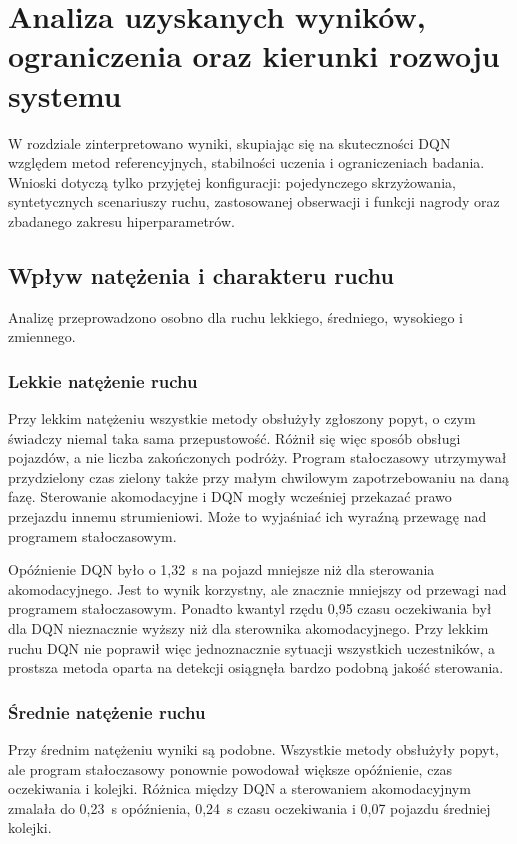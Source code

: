 \clearpage
\section{Analiza uzyskanych wyników, ograniczenia oraz kierunki rozwoju systemu}
\label{sec:analiza}

W rozdziale zinterpretowano wyniki, skupiając się na skuteczności DQN względem metod referencyjnych, stabilności uczenia i ograniczeniach badania. Wnioski dotyczą tylko przyjętej konfiguracji: pojedynczego skrzyżowania, syntetycznych scenariuszy ruchu, zastosowanej obserwacji i funkcji nagrody oraz zbadanego zakresu hiperparametrów.

\subsection{Wpływ natężenia i charakteru ruchu}
\label{subsec:analiza-natezenia}

Analizę przeprowadzono osobno dla ruchu lekkiego, średniego, wysokiego i zmiennego.

\subsubsection{Lekkie natężenie ruchu}

Przy lekkim natężeniu wszystkie metody obsłużyły zgłoszony popyt, o czym świadczy niemal taka sama przepustowość. Różnił się więc sposób obsługi pojazdów, a nie liczba zakończonych podróży. Program stałoczasowy utrzymywał przydzielony czas zielony także przy małym chwilowym zapotrzebowaniu na daną fazę. Sterowanie akomodacyjne i DQN mogły wcześniej przekazać prawo przejazdu innemu strumieniowi. Może to wyjaśniać ich wyraźną przewagę nad programem stałoczasowym.

Opóźnienie DQN było o 1,32~s na pojazd mniejsze niż dla sterowania akomodacyjnego. Jest to wynik korzystny, ale znacznie mniejszy od przewagi nad programem stałoczasowym. Ponadto kwantyl rzędu 0,95 czasu oczekiwania był dla DQN nieznacznie wyższy niż dla sterownika akomodacyjnego. Przy lekkim ruchu DQN nie poprawił więc jednoznacznie sytuacji wszystkich uczestników, a prostsza metoda oparta na detekcji osiągnęła bardzo podobną jakość sterowania.

\subsubsection{Średnie natężenie ruchu}

Przy średnim natężeniu wyniki są podobne. Wszystkie metody obsłużyły popyt, ale program stałoczasowy ponownie powodował większe opóźnienie, czas oczekiwania i kolejki. Różnica między DQN a sterowaniem akomodacyjnym zmalała do 0,23~s opóźnienia, 0,24~s czasu oczekiwania i 0,07 pojazdu średniej kolejki.


